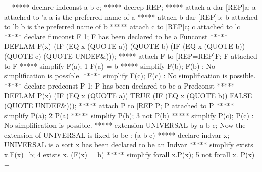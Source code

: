 \gfexample+
   ***** declare indconst a b c;
   ***** decrep REP;
   ***** attach a dar [REP]a;
   a attached to 'a
   a is the preferred name of a
   ***** attach b dar [REP]b;
   b attached to 'b
   b is the preferred name of b
   ***** attach c to [REP]c;
   c attached to 'c
   ***** declare funconst F 1;
   F has been declared to be a Funconst
   ***** DEFLAM F(x) (IF (EQ x (QUOTE a)) (QUOTE b) 
                         (IF (EQ x (QUOTE b)) (QUOTE c)
                          (QUOTE UNDEF&)));
   ***** attach F to [REP=REP]F;
   F attached to F
   ***** simplify F(a);
   1   F(a) = b    
   ***** simplify F(b);
   F(b) : No simplification is possible.
   ***** simplify F(c);
   F(c) : No simplification is possible.
   ***** declare predconst P 1;
   P has been declared to be a Predconst
   ***** DEFLAM P(x) (IF (EQ x (QUOTE a)) TRUE 
                         (IF (EQ x (QUOTE b)) FALSE 
                          (QUOTE UNDEF&)));
   ***** attach P to [REP]P;
   P attached to P
   ***** simplify P(a);
   2   P(a)  
   ***** simplify P(b);
   3   not P(b)    
   ***** simplify P(c);
   P(c) : No simplification is possible.
   ***** extension UNIVERSAL by {a b c};
   Now the extension of UNIVERSAL is fixed to be : (a b c)
   ***** declare indvar x;
   UNIVERSAL is a sort
   x has been declared to be an Indvar
   ***** simplify exists x.F(x)=b;
   4   exists x. (F(x) = b)
   ***** simplify forall x.P(x);
   5   not forall x. P(x) 
+


